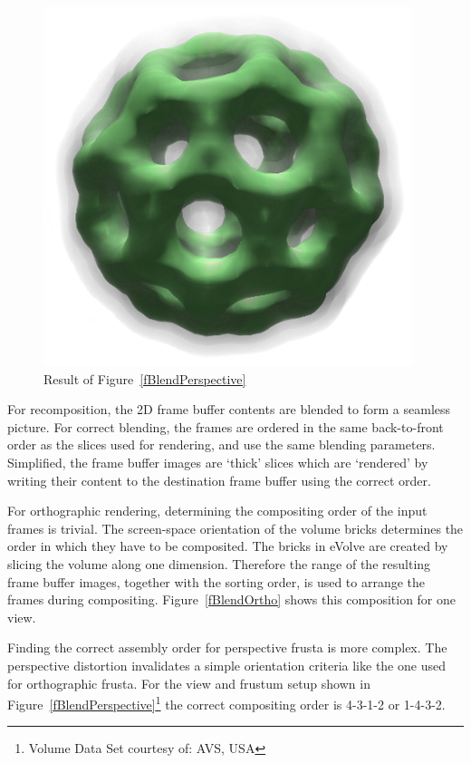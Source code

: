 \documentclass[10pt,a4]{scrartcl}
\newcommand{\fig}[1]{Figure~\ref{#1}}
\begin{document}
\begin{figure}
  \includegraphics[width=.382\textwidth]{images/volResult.png}
  {\caption{\label{fVolResult}Result of \fig{fBlendPerspective}}}
\end{figure}
For recomposition, the 2D frame buffer contents are blended to form a
seamless picture. For correct blending, the frames are ordered in the
same back-to-front order as the slices used for rendering, and use the
same blending parameters. Simplified, the frame buffer images are
`thick' slices which are `rendered' by writing their content to the
destination frame buffer using the correct order.

For orthographic rendering, determining the compositing order of the
input frames is trivial. The screen-space orientation of the volume
bricks determines the order in which they have to be composited. The
bricks in \textsf{eVolve} are created by slicing the volume along one
dimension. Therefore the range of the resulting frame buffer images,
together with the sorting order, is used to arrange the frames during
compositing. \fig{fBlendOrtho} shows this composition for one view.

Finding the correct assembly order for perspective frusta is more
complex. The perspective distortion invalidates a simple orientation
criteria like the one used for orthographic frusta. For the view and
frustum setup shown in \fig{fBlendPerspective}\footnote{Volume Data Set
  courtesy of: AVS, USA} the correct compositing order is 4-3-1-2 or
1-4-3-2.
\end{document}
